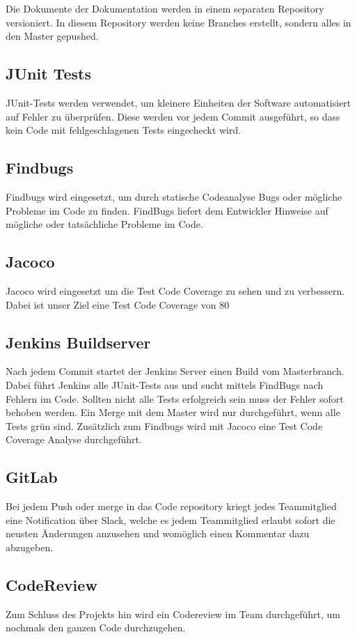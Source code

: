 \documentclass[11pt]{scrartcl}
\begin{document}
Die Dokumente der Dokumentation werden in einem separaten 
Repository versioniert. In diesem Repository werden keine Branches 
erstellt, sondern alles in den Master gepushed.
\subsection{JUnit Tests}
JUnit-Tests werden verwendet, um kleinere Einheiten der Software 
automatisiert auf Fehler zu überprüfen. Diese werden vor jedem Commit ausgeführt, 
so dass kein Code mit fehlgeschlagenen Tests eingecheckt wird.
\subsection{Findbugs}
Findbugs wird eingesetzt, um durch statische Codeanalyse Bugs 
oder mögliche Probleme im Code zu finden. FindBugs liefert dem Entwickler 
Hinweise auf mögliche oder tatsächliche Probleme im Code.
\subsection{Jacoco}
Jacoco wird eingesetzt um die Test Code Coverage zu sehen und zu verbessern.
Dabei ist unser Ziel eine Test Code Coverage von 80 %
\subsection{Jenkins Buildserver}
Nach jedem Commit startet der Jenkins Server einen Build vom Masterbranch. 
Dabei führt Jenkins alle JUnit-Tests aus und sucht mittels FindBugs nach
 Fehlern im Code. Sollten nicht alle Tests erfolgreich sein muss der 
 Fehler sofort behoben werden. Ein Merge mit dem Master wird nur durchgeführt, 
 wenn alle Tests grün sind.
 Zusätzlich zum Findbugs wird mit Jacoco eine Test Code Coverage Analyse 
 durchgeführt.
 \subsection{GitLab}
 Bei jedem Push oder merge in das Code repository kriegt jedes Teammitglied eine 
 Notification über Slack, welche es jedem Teammitglied erlaubt sofort die 
 neusten Änderungen anzusehen und womöglich einen Kommentar dazu abzugeben.
\subsection{CodeReview}
Zum Schluss des Projekts hin wird ein Codereview im Team durchgeführt, um 
nochmals den ganzen Code durchzugehen.
\end{document}
